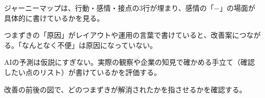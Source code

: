 \begin{point}
  \item ジャーニーマップは、行動・感情・接点の3行が埋まり、感情の「−」の場面が具体的に書けているかを見る。
  \item つまずきの「原因」がレイアウトや運用の言葉で書けていると、改善案につながる。「なんとなく不便」は原因になっていない。
  \item AIの予測は仮説にすぎない。実際の観察や企業の知見で確かめる手立て（確認したい点のリスト）が書けているかを評価する。
  \item 改善の前後の図で、どのつまずきが解消されたかを指させるかを確認する。
\end{point}
